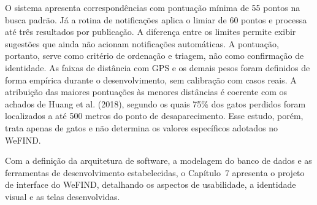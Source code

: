 O sistema apresenta correspondências com pontuação mínima de 55 pontos na busca padrão. Já a rotina de notificações aplica o limiar de 60 pontos e processa até três resultados por publicação. A diferença entre os limites permite exibir sugestões que ainda não acionam notificações automáticas. A pontuação, portanto, serve como critério de ordenação e triagem, não como confirmação de identidade. As faixas de distância com GPS e os demais pesos foram definidos de forma empírica durante o desenvolvimento, sem calibração com casos reais. A atribuição das maiores pontuações às menores distâncias é coerente com os achados de Huang et al. (2018), segundo os quais 75\% dos gatos perdidos foram localizados a até 500 metros do ponto de desaparecimento. Esse estudo, porém, trata apenas de gatos e não determina os valores específicos adotados no WeFIND.

Com a definição da arquitetura de software, a modelagem do banco de dados e as ferramentas de desenvolvimento estabelecidas, o Capítulo~7 apresenta o projeto de interface do WeFIND, detalhando os aspectos de usabilidade, a identidade visual e as telas desenvolvidas.
